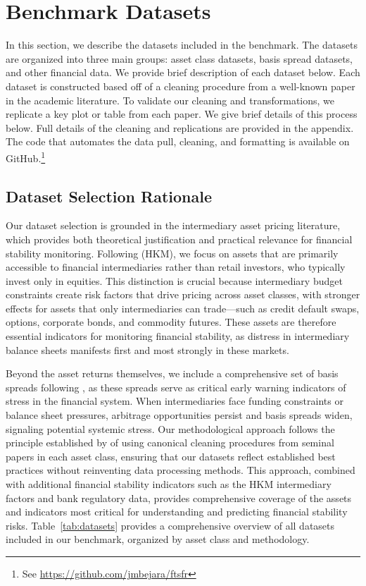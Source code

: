 \documentclass{article}
\begin{document}
\section{Benchmark Datasets}

In this section, we describe the datasets included in the benchmark. The datasets are organized into three main groups: asset class datasets, basis spread datasets, and other financial data. We provide brief description of each dataset below. Each dataset is constructed based off of a cleaning procedure from a well-known paper in the academic literature. To validate our cleaning and transformations, we replicate a key plot or table from each paper. We give brief details of this process below. Full details of the cleaning and replications are provided in the appendix.
The code that automates the data pull, cleaning, and formatting is available on GitHub.\footnote{See \url{https://github.com/jmbejara/ftsfr}}

\subsection{Dataset Selection Rationale}
Our dataset selection is grounded in the intermediary asset pricing literature, which provides both theoretical justification and practical relevance for financial stability monitoring. Following \citet{He2017} (HKM), we focus on assets that are primarily accessible to financial intermediaries rather than retail investors, who typically invest only in equities. This distinction is crucial because intermediary budget constraints create risk factors that drive pricing across asset classes, with stronger effects for assets that only intermediaries can trade—such as credit default swaps, options, corporate bonds, and commodity futures. These assets are therefore essential indicators for monitoring financial stability, as distress in intermediary balance sheets manifests first and most strongly in these markets.

Beyond the asset returns themselves, we include a comprehensive set of basis spreads following \citet{Siriwardane2021}, as these spreads serve as critical early warning indicators of stress in the financial system. When intermediaries face funding constraints or balance sheet pressures, arbitrage opportunities persist and basis spreads widen, signaling potential systemic stress. Our methodological approach follows the principle established by \citet{He2017} of using canonical cleaning procedures from seminal papers in each asset class, ensuring that our datasets reflect established best practices without reinventing data processing methods. This approach, combined with additional financial stability indicators such as the HKM intermediary factors and bank regulatory data, provides comprehensive coverage of the assets and indicators most critical for understanding and predicting financial stability risks. Table~\ref{tab:datasets} provides a comprehensive overview of all datasets included in our benchmark, organized by asset class and methodology. 
\end{document}
